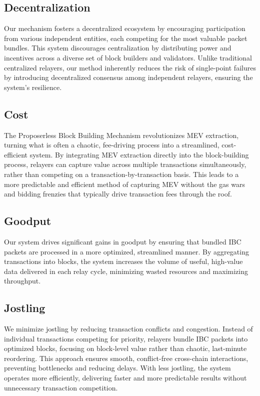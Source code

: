 \documentclass{article}
\begin{document}
\subsection*{Decentralization}

Our mechanism fosters a decentralized ecosystem by encouraging participation from various independent entities, each competing for the most valuable packet bundles. This system discourages centralization by distributing power and incentives across a diverse set of block builders and validators. Unlike traditional centralized relayers, our method inherently reduces the risk of single-point failures by introducing decentralized consensus among independent relayers, ensuring the system’s resilience.

\subsection*{Cost}

The Proposerless Block Building Mechanism revolutionizes MEV extraction, turning what is often a chaotic, fee-driving process into a streamlined, cost-efficient system. By integrating MEV extraction directly into the block-building process, relayers can capture value across multiple transactions simultaneously, rather than competing on a transaction-by-transaction basis. This leads to a more predictable and efficient method of capturing MEV without the gas wars and bidding frenzies that typically drive transaction fees through the roof.

\subsection*{Goodput}

Our system drives significant gains in goodput by ensuring that bundled IBC packets are processed in a more optimized, streamlined manner. By aggregating transactions into blocks, the system increases the volume of useful, high-value data delivered in each relay cycle, minimizing wasted resources and maximizing throughput.

\subsection*{Jostling}

We minimize jostling by reducing transaction conflicts and congestion. Instead of individual transactions competing for priority, relayers bundle IBC packets into optimized blocks, focusing on block-level value rather than chaotic, last-minute reordering. This approach ensures smooth, conflict-free cross-chain interactions, preventing bottlenecks and reducing delays. With less jostling, the system operates more efficiently, delivering faster and more predictable results without unnecessary transaction competition.
\end{document}
